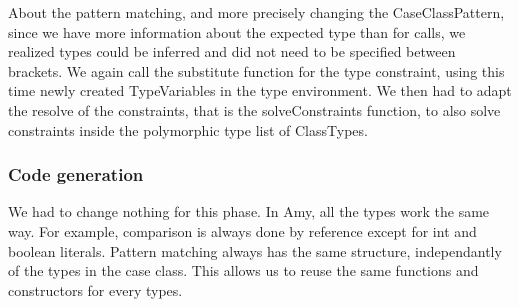 About the pattern matching, and more precisely changing the CaseClassPattern, since we have more information about the expected type than for calls, we realized types could be inferred and did not need to be specified between brackets. We again call the substitute function for the type constraint, using this time newly created TypeVariables in the type environment. We then had to adapt the resolve of the constraints, that is the solveConstraints function, to also solve constraints inside the polymorphic type list of ClassTypes.
\subsubsection{Code generation}
We had to change nothing for this phase. In Amy, all the types work the same way. For example, comparison is always done by reference except for int and boolean literals. Pattern matching always has the same structure, independantly of the types in the case class. This allows us to reuse the same functions and constructors for every types.
